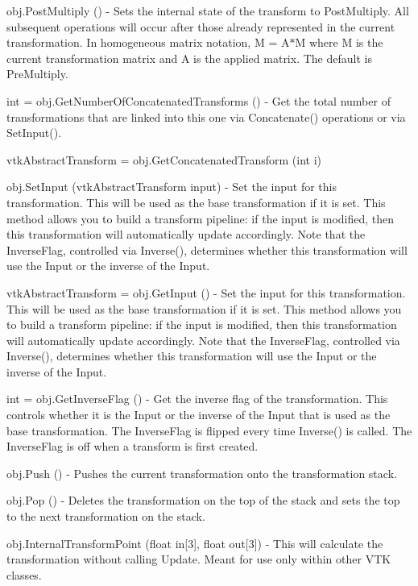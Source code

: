 \begin{DoxyItemize}
\item {\ttfamily obj.\-Post\-Multiply ()} -\/ Sets the internal state of the transform to Post\-Multiply. All subsequent operations will occur after those already represented in the current transformation. In homogeneous matrix notation, M = A$\ast$\-M where M is the current transformation matrix and A is the applied matrix. The default is Pre\-Multiply.  
\item {\ttfamily int = obj.\-Get\-Number\-Of\-Concatenated\-Transforms ()} -\/ Get the total number of transformations that are linked into this one via Concatenate() operations or via Set\-Input().  
\item {\ttfamily vtk\-Abstract\-Transform = obj.\-Get\-Concatenated\-Transform (int i)}  
\item {\ttfamily obj.\-Set\-Input (vtk\-Abstract\-Transform input)} -\/ Set the input for this transformation. This will be used as the base transformation if it is set. This method allows you to build a transform pipeline\-: if the input is modified, then this transformation will automatically update accordingly. Note that the Inverse\-Flag, controlled via Inverse(), determines whether this transformation will use the Input or the inverse of the Input.  
\item {\ttfamily vtk\-Abstract\-Transform = obj.\-Get\-Input ()} -\/ Set the input for this transformation. This will be used as the base transformation if it is set. This method allows you to build a transform pipeline\-: if the input is modified, then this transformation will automatically update accordingly. Note that the Inverse\-Flag, controlled via Inverse(), determines whether this transformation will use the Input or the inverse of the Input.  
\item {\ttfamily int = obj.\-Get\-Inverse\-Flag ()} -\/ Get the inverse flag of the transformation. This controls whether it is the Input or the inverse of the Input that is used as the base transformation. The Inverse\-Flag is flipped every time Inverse() is called. The Inverse\-Flag is off when a transform is first created.  
\item {\ttfamily obj.\-Push ()} -\/ Pushes the current transformation onto the transformation stack.  
\item {\ttfamily obj.\-Pop ()} -\/ Deletes the transformation on the top of the stack and sets the top to the next transformation on the stack.  
\item {\ttfamily obj.\-Internal\-Transform\-Point (float in\mbox{[}3\mbox{]}, float out\mbox{[}3\mbox{]})} -\/ This will calculate the transformation without calling Update. Meant for use only within other V\-T\-K classes.  

\end{DoxyItemize}

